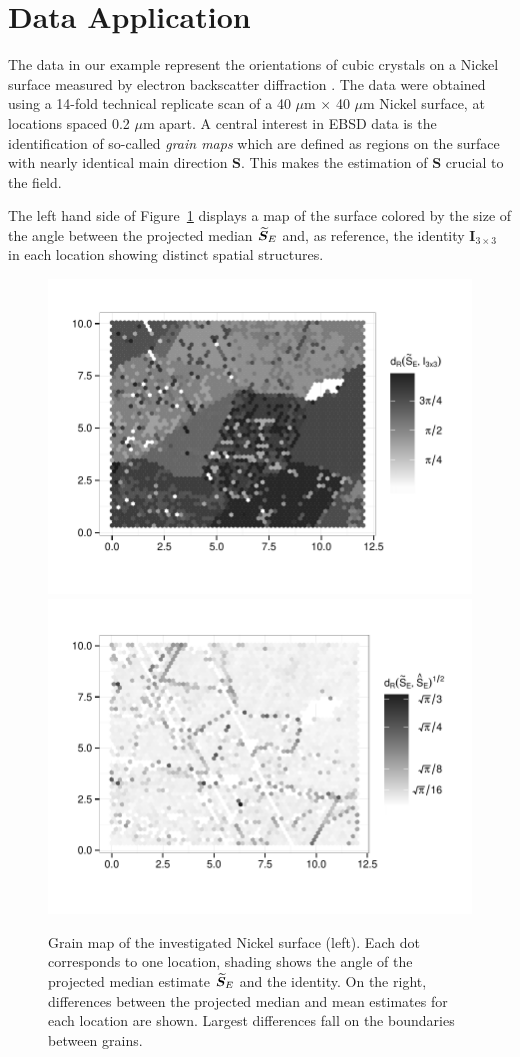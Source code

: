 \section{Data Application}\label{sec:data}

The data in our example represent the orientations of cubic crystals on a Nickel surface measured by electron backscatter diffraction \citep{bingham10b}. The data were obtained using a 14-fold technical replicate scan of a 40 $\mu$m $\times$ 40 $\mu$m Nickel surface, at locations spaced 0.2 $\mu$m apart.
A central interest in EBSD data is the identification of so-called {\it grain maps} which are defined as regions on the surface with nearly identical main direction $\bm S$. This makes the estimation of $\bm S$ crucial to the field. 

The left hand side of Figure~\ref{fig:grain-map} displays a map of the surface colored by the size of the angle between the projected median ${\widetilde{\bm S}_E}$ and, as reference,  the identity $\bm I_{3\times 3}$ in each location showing distinct spatial structures.

\begin{figure}[htbp] %
   \centering
   \includegraphics[width=.49\textwidth]{images/grain-map.pdf} 
   \includegraphics[width=.49\textwidth]{images/grain-diff.pdf} 
   \caption{ \label{fig:grain-map}Grain map of the investigated Nickel surface (left). Each dot corresponds to one location, shading shows the angle of the projected median estimate ${\widetilde{\bm S}_E}$ and the identity. On the right, differences between the projected median and mean estimates for each location are shown. Largest differences fall on the boundaries between grains.}
\end{figure}

